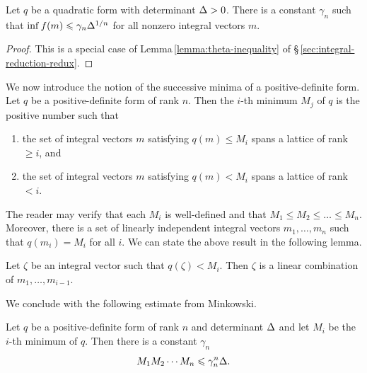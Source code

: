 \begin{theoremx}\label{thm:minkowski-infimum} {\normalfont
    \cite[p.\,260]{cassels2008rational}} Let \(q\) be a quadratic form with
    determinant \({\Delta} > 0\). There is a constant \(\gamma_n\) such that
    \(\inf f(m) \leqslant \gamma_n{\Delta}^{1/n}\) for all nonzero integral vectors
    \(m\).
\end{theoremx}

\begin{proof}
    This is a special case of Lemma\,\ref{lemma:theta-inequality} of
    \S\,\ref{sec:integral-reduction-redux}.
\end{proof}

\bigskip

We now introduce the notion of the successive minima of a positive-definite
form. Let \(q\) be a positive-definite form of rank \(n\). Then the \(i\)-th
minimum \(M_j\) of \(q\) is the positive number such that

\medskip

\begin{enumerate}[nosep, label=(\roman*)]
    \item the set of integral vectors \(m\) satisfying \(q(m) \leq M_i\) spans a
    lattice of rank \(\geq i\), and
    \item the set of integral vectors \(m\) satisfying \(q(m) < M_i\) spans a
    lattice of rank \(< i\).
\end{enumerate}

\medskip 

The reader may verify that each \(M_i\) is well-defined and that \(M_1 \leq M_2
\leq \dots \leq M_n\). Moreover, there is a set of linearly independent integral
vectors \(m_1, \dots, m_n\) such that \(q(m_i) = M_i\) for all \(i\). We can
state the above result in the following lemma.

\begin{lemma}
    Let \(\zeta\) be an integral vector such that \(q(\zeta) < M_i\). Then
    \(\zeta\) is a linear combination of \(m_1, \dots, m_{i-1}\).
\end{lemma}

We conclude with the following estimate from Minkowski.

\begin{theoremx}\label{thm:minkowski-successive-minima} {\normalfont
    \cite[p.\,262--263]{cassels2008rational}} Let \(q\) be a positive-definite
    form of rank \(n\) and determinant \({\Delta}\) and let \(M_i\) be the
    \(i\)-th minimum of \(q\). Then there is a constant \(\gamma_n\)
    \[
        M_1 M_2 \cdots M_n \leqslant \gamma_n^n {\Delta}.
    \]
\end{theoremx}


